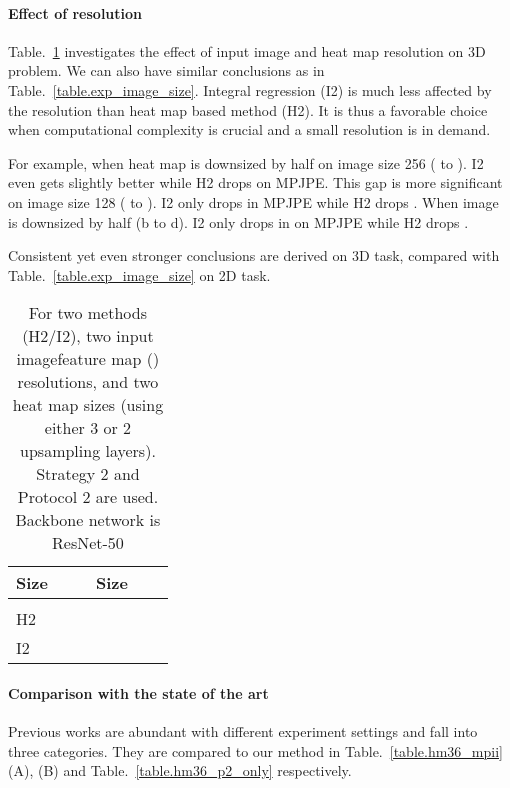 \documentclass[runningheads]{llncs}
\begin{document}
\paragraph{\textbf{Effect of resolution}}
Table.~\ref{table.exp_image_size_hm36} investigates the effect of input image and heat map resolution on 3D problem. We can also have similar conclusions as in Table.~\ref{table.exp_image_size}. Integral regression (I2) is much less affected by the resolution than heat map based method (H2). It is thus a favorable choice when computational complexity is crucial and a small resolution is in demand. 

For example, when heat map is downsized by half on image size 256 ( to ). I2 even gets slightly better while H2 drops  on MPJPE. This gap is more significant on image size 128 ( to ). I2 only drops  in MPJPE while H2 drops . When image is downsized by half (b to d). I2 only drops in  on MPJPE while H2 drops .

Consistent yet even stronger conclusions are derived on 3D task, compared with Table.~\ref{table.exp_image_size} on 2D task.

\begin{table}[t]
\caption{For two methods (H2/I2), two input imagefeature map () resolutions, and two heat map sizes (using either 3 or 2 upsampling layers). Strategy 2 and Protocol 2 are used. Backbone network is ResNet-50}
\begin{center}
\begin{tabular}{l | l | l | l | l | l}
\hline
 Size &  &  & Size &  & \\
 \hline
 &  &  &  &  & \\
\hline
H2 &  &  & &  &  \\
I2 &  &  & &  &  \\
\hline
\end{tabular}
\end{center}
\label{table.exp_image_size_hm36}
\end{table}

\paragraph{\textbf{Comparison with the state of the art}} Previous works are abundant with different experiment settings and fall into three categories. They are compared to our method in Table.~\ref{table.hm36_mpii} (A), (B) and Table.~\ref{table.hm36_p2_only} respectively.
\end{document}
